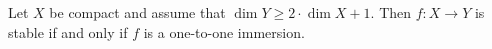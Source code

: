 Let $X$ be compact and assume that $\dim Y \geq 2 \cdot \dim X + 1$. Then $f: X \to Y$ is stable if and only if $f$ is a one-to-one immersion.
